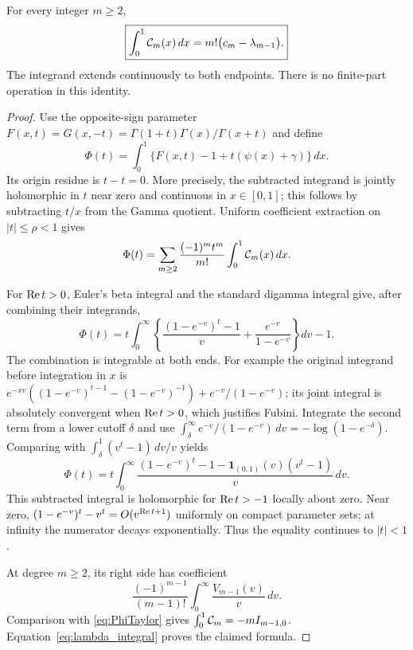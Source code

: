 \begin{theorem}
\label{thm:Cintegral}
For every integer $m\ge2$,
\begin{equation}\label{eq:Cintegral}
 \boxed{\displaystyle
 \int_0^1\mathcal C_m(x)\,dx=m!\bigl(c_m-\lambda_{m-1}\bigr).}
\end{equation}
The integrand extends continuously to both endpoints. There is no
finite-part operation in this identity.
\end{theorem}
\begin{proof}
Use the opposite-sign parameter
$F(x,t)=G(x,-t)=\Gamma(1+t)\Gamma(x)/\Gamma(x+t)$ and define
\[
 \Phi(t)=\int_0^1\{F(x,t)-1+t(\psi(x)+\gamma)\}\,dx.
\]
Its origin residue is $t-t=0$. More precisely, the subtracted
integrand is jointly holomorphic in $t$ near zero and continuous in
$x\in[0,1]$; this follows by subtracting $t/x$ from the Gamma
quotient. Uniform coefficient extraction on $|t|\le\rho<1$ gives
\begin{equation}\label{eq:PhiTaylor}
 \Phi(t)=\sum_{m\ge2}\frac{(-1)^m t^m}{m!}
                    \int_0^1\mathcal C_m(x)\,dx.
\end{equation}

For $\operatorname{Re} t>0$, Euler's beta integral and the standard digamma
integral give, after combining their integrands,
\[
 \Phi(t)=t\int_0^\infty
 \left\{\frac{(1-e^{-v})^t-1}{v}
             +\frac{e^{-v}}{1-e^{-v}}\right\}dv-1.
\]
The combination is integrable at both ends. For example the original
integrand before integration in $x$ is
$e^{-xv}((1-e^{-v})^{t-1}-(1-e^{-v})^{-1})
+e^{-v}/(1-e^{-v})$; its joint integral is absolutely convergent
when $\operatorname{Re} t>0$, which justifies Fubini.
Integrate the second term from a lower cutoff $\delta$ and use
$\int_\delta^\infty e^{-v}/(1-e^{-v})\,dv
=-\log(1-e^{-\delta})$. Comparing with
$\int_\delta^1(v^t-1)\,dv/v$ yields
\begin{equation}\label{eq:PhiMellin}
 \Phi(t)=t\int_0^\infty
 \frac{(1-e^{-v})^t-1-\boldsymbol1_{(0,1)}(v)(v^t-1)}v\,dv.
\end{equation}
This subtracted integral is holomorphic for $\operatorname{Re} t>-1$ locally
about zero. Near zero, $(1-e^{-v})^t-v^t=O(v^{\operatorname{Re} t+1})$
uniformly on compact parameter sets; at infinity the numerator
decays exponentially. Thus the equality continues to $|t|<1$.

At degree $m\ge2$, its right side has coefficient
\[
 \frac{(-1)^{m-1}}{(m-1)!}
             \int_0^\infty\frac{V_{m-1}(v)}v\,dv.
\]
Comparison with \eqref{eq:PhiTaylor} gives
$\int_0^1\mathcal C_m=-m I_{m-1,0}$.
Equation~\eqref{eq:lambda_integral} proves the claimed formula.
\end{proof}

